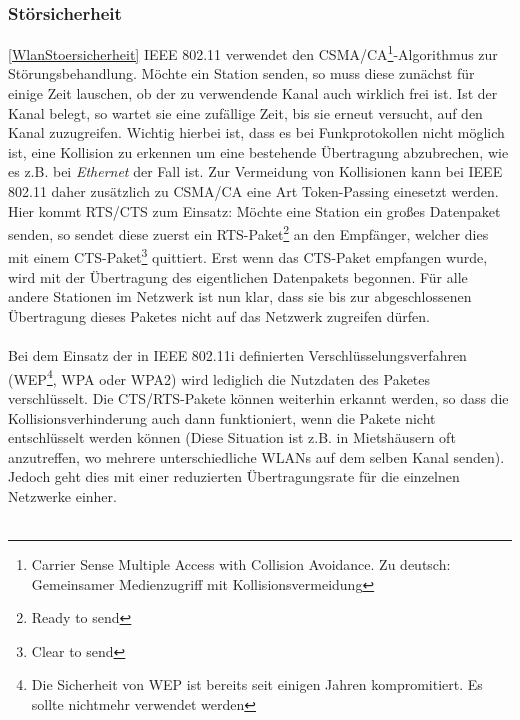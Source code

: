         \subsubsection{Störsicherheit}\ref{WlanStoersicherheit}
            IEEE 802.11 verwendet den CSMA/CA\footnote{Carrier Sense Multiple Access with 
            Collision Avoidance. Zu deutsch: Gemeinsamer Medienzugriff mit Kollisionsvermeidung}-Algorithmus
            zur Störungsbehandlung. Möchte ein Station senden, so muss diese zunächst
            für einige Zeit lauschen, ob der zu verwendende Kanal auch wirklich frei ist.
            Ist der Kanal belegt, so wartet sie eine zufällige Zeit, bis sie erneut versucht,
            auf den Kanal zuzugreifen. Wichtig hierbei ist, dass es bei Funkprotokollen nicht
            möglich ist, eine Kollision zu erkennen um eine bestehende Übertragung abzubrechen,
            wie es z.B. bei \textsl{Ethernet} der Fall ist. Zur Vermeidung von Kollisionen
            kann bei IEEE 802.11 daher zusätzlich zu CSMA/CA eine Art Token-Passing einesetzt
            werden. Hier kommt RTS/CTS zum Einsatz: Möchte eine Station ein großes Datenpaket
            senden, so sendet diese zuerst ein RTS-Paket\footnote{Ready to send} an den Empfänger, 
            welcher dies mit einem CTS-Paket\footnote{Clear to send} quittiert. Erst wenn das
            CTS-Paket empfangen wurde, wird mit der Übertragung des eigentlichen Datenpakets
            begonnen. Für alle andere Stationen im Netzwerk ist nun klar, dass sie bis zur
            abgeschlossenen Übertragung dieses Paketes nicht auf das Netzwerk zugreifen
            dürfen.\\
            \\
            Bei dem Einsatz der in IEEE 802.11i definierten Verschlüsselungsverfahren
            (WEP\footnote{Die Sicherheit von WEP ist bereits seit einigen Jahren
             kompromitiert. Es sollte nichtmehr verwendet werden}, WPA oder WPA2) wird
            lediglich die Nutzdaten des Paketes verschlüsselt. Die CTS/RTS-Pakete können
            weiterhin erkannt werden, so dass die Kollisionsverhinderung auch dann
            funktioniert, wenn die Pakete nicht entschlüsselt werden können (Diese 
            Situation ist z.B. in Mietshäusern oft anzutreffen, wo mehrere 
            unterschiedliche WLANs auf dem selben Kanal senden). Jedoch geht dies
            mit einer reduzierten Übertragungsrate für die einzelnen Netzwerke
            einher.\\
            \\
